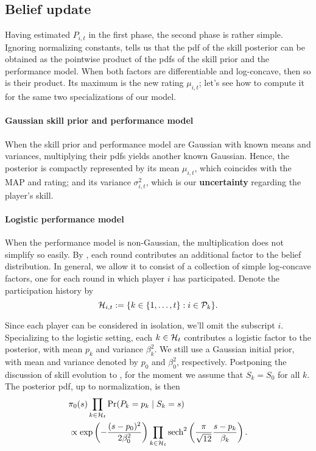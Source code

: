 \subsection{Belief update}
\label{sec:belief}

Having estimated $P_{i,t}$ in the first phase, the second phase is rather simple. Ignoring normalizing constants,  tells us that the pdf of the skill posterior can be obtained as the pointwise product of the pdfs of the skill prior and the performance model. When both factors are differentiable and log-concave, then so is their product. Its maximum is the new rating $\mu_{i,t}$; let's see how to compute it for the same two specializations of our model.

\paragraph{Gaussian skill prior and performance model}
When the skill prior and performance model are Gaussian with known means and variances, multiplying their pdfs yields another known Gaussian. Hence, the posterior is compactly represented by its mean $\mu_{i,t}$, which coincides with the MAP and rating; and its variance $\sigma_{i,t}^2$, which is our \textbf{uncertainty} regarding the player's skill.

\paragraph{Logistic performance model}
When the performance model is non-Gaussian, the multiplication does not simplify so easily. By , each round contributes an additional factor to the belief distribution. In general, we allow it to consist of a collection of simple log-concave factors, one for each round in which player $i$ has participated. Denote the participation history by
\[{\mathcal{H}}_{i,t} := \{k\in\{1,\ldots,t\}:i\in\mathcal P_k\}.\]

Since each player can be considered in isolation, we'll omit the subscript $i$. Specializing to the logistic setting, each $k\in{\mathcal{H}}_t$ contributes a logistic factor to the posterior, with mean $p_k$ and variance $\beta_k^2$. We still use a Gaussian initial prior, with mean and variance denoted by $p_0$ and $\beta_0^2$, respectively. Postponing the discussion of skill evolution to , for the moment we assume that $S_k=S_0$ for all $k$. The posterior pdf, up to normalization, is then
\begin{align}
&\pi_0(s) \prod_{k\in{\mathcal{H}}_t} \Pr(P_k=p_k \mid S_k=s) \nonumber
\\&\propto \exp\left( -\frac{(s-p_0)^2}{2\beta_0^2} \right) \label{eq:posterior}
\prod_{k\in{\mathcal{H}}_t} \operatorname{sech}^{2}\left( \frac\pi{\sqrt{12}} \frac{s-p_k} {\beta_k} \right).
\end{align}

